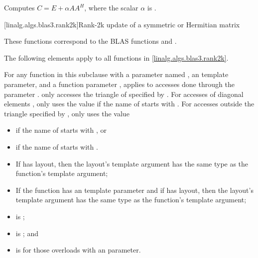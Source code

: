 \begin{itemdescr}
\pnum
\effects
Computes $C = E + \alpha A A^H$,
where the scalar $\alpha$ is .
\end{itemdescr}

[linalg.algs.blas3.rank2k]{Rank-2k update of a symmetric or Hermitian matrix}

\pnum
\begin{note}
These functions correspond to the BLAS functions
 and \supercite{blas3}.
\end{note}

\pnum
The following elements apply to all functions in \ref{linalg.algs.blas3.rank2k}.

\pnum
For any function  in this subclause with
a parameter named ,
an  template parameter, and
a function parameter ,
 applies to accesses done through the parameter .
 only accesses the triangle of  specified by .
For accesses of diagonal elements ,
 only uses the value 
if the name of  starts with .
For accesses  outside the triangle specified by ,
 only uses the value
\begin{itemize}
\item
{}
if the name of  starts with , or
\item
{}
if the name of  starts with .
\end{itemize}

\pnum
\mandates
\begin{itemize}
\item
If  has  layout,
then the layout's  template argument has
the same type as the function's  template argument;
\item
If the function has an  template parameter and
if  has  layout,
then the layout's  template argument has
the same type as the function's  template argument;
\item
{}
is ;
\item
{}
is ; and
\item
{}
is  for those overloads with an  parameter.
\end{itemize}

